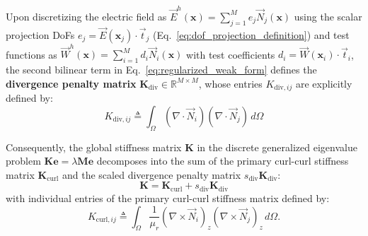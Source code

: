 \documentclass[preprint,12pt]{elsarticle}
\begin{document}
Upon discretizing the electric field as $\vec{E}^h(\mathbf{x}) = \sum_{j=1}^{M} e_j \vec{N}_j(\mathbf{x})$ using the scalar projection DoFs $e_j = \vec{E}(\mathbf{x}_j) \cdot \vec{t}_j$ (Eq.~\eqref{eq:dof_projection_definition}) and test functions as $\vec{W}^h(\mathbf{x}) = \sum_{i=1}^{M} d_i \vec{N}_i(\mathbf{x})$ with test coefficients $d_i = \vec{W}(\mathbf{x}_i) \cdot \vec{t}_i$, the second bilinear term in Eq.~\eqref{eq:regularized_weak_form} defines the \textbf{divergence penalty matrix} $\mathbf{K}_{\mathrm{div}} \in \mathbb{R}^{M \times M}$, whose entries $K_{\mathrm{div}, ij}$ are explicitly defined by:
\begin{equation}
    K_{\mathrm{div}, ij} \triangleq \int_{\Omega} (\nabla \cdot \vec{N}_i) (\nabla \cdot \vec{N}_j) \, d\Omega
    \label{eq:K_div_definition}
\end{equation}

Consequently, the global stiffness matrix $\mathbf{K}$ in the discrete generalized eigenvalue problem $\mathbf{K} \mathbf{e} = \lambda \mathbf{M} \mathbf{e}$ decomposes into the sum of the primary curl-curl stiffness matrix $\mathbf{K}_{\mathrm{curl}}$ and the scaled divergence penalty matrix $s_{\mathrm{div}} \mathbf{K}_{\mathrm{div}}$:
\begin{equation}
    \mathbf{K} = \mathbf{K}_{\mathrm{curl}} + s_{\mathrm{div}} \mathbf{K}_{\mathrm{div}}
    \label{eq:K_global_decomposition}
\end{equation}
with individual entries of the primary curl-curl stiffness matrix defined by:
\begin{equation}
    K_{\mathrm{curl}, ij} \triangleq \int_{\Omega} \frac{1}{\mu_r} (\nabla \times \vec{N}_i)_z (\nabla \times \vec{N}_j)_z \, d\Omega.
    \label{eq:K_curl_definition}
\end{equation}
\end{document}
